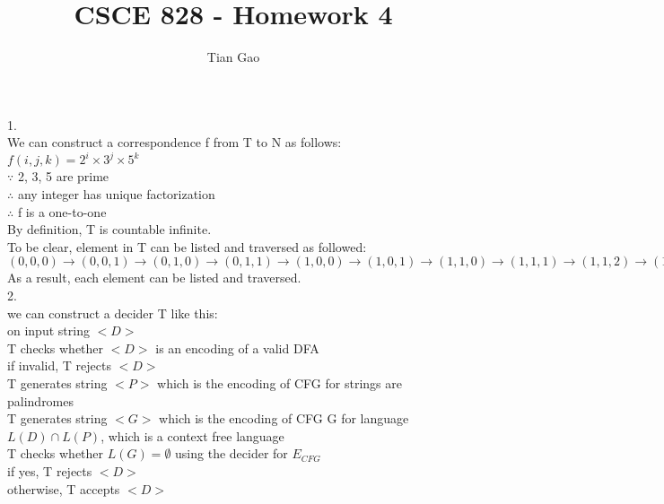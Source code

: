 \documentclass[a4paper]{article}
\title{CSCE 828 - Homework 4}
\author{Tian Gao}
\begin{document}
\maketitle


1.\\
We can construct a correspondence f from T to N as follows:\\
$f(i,j,k)=2^i \times 3^j \times 5^k$\\
$\because$ 2, 3, 5 are prime\\
$\therefore$ any integer has unique factorization\\
$\therefore$ f is a one-to-one\\
By definition, T is countable infinite.\\
To be clear, element in T can be listed and traversed as followed:\\
$(0, 0, 0) \rightarrow (0, 0, 1) \rightarrow (0,1,0) \rightarrow (0,1,1) \rightarrow (1,0,0) \rightarrow (1,0,1) \rightarrow (1,1,0) \rightarrow (1,1,1) \rightarrow (1,1,2) \rightarrow (1,2,1) \rightarrow (1,2,2) ... $\\
As a result, each element can be listed and traversed.\\

2.\\
we can construct a decider T like this:\\
on input string $< D >$\\
\hspace*{5mm} T checks whether $< D >$ is an encoding of a valid DFA\\
\hspace*{1cm} 	if invalid, T rejects $< D >$\\
\hspace*{5mm} T generates string $<P>$ which is the encoding of CFG for strings are \hspace*{5mm} palindromes\\
\hspace*{5mm}    T generates string $<G>$ which is the encoding of CFG G for language \hspace*{5mm} $L(D) \cap L(P)$, which is a context free language\\
\hspace*{5mm}    T checks whether $L(G) = \emptyset$ using the decider for $E_{CFG}$\\
\hspace*{1cm}    	if yes, T rejects $<D>$\\
\hspace*{1cm}       otherwise, T accepts $<D>$\\
        
\end{document}
